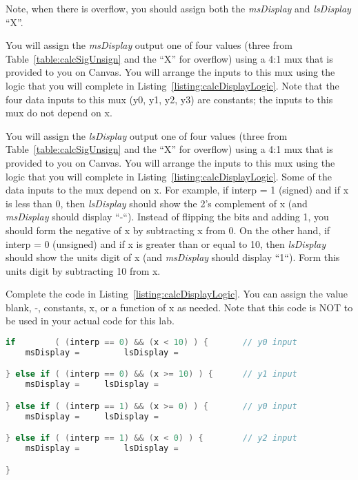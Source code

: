 Note, when there is overflow, you should assign both the
\emph{msDisplay} and \emph{lsDisplay} ``X''.

You will assign the \emph{msDisplay} output one of four values (three
from Table~\ref{table:calcSigUnsign} and the ``X'' for overflow) using a 4:1 mux that is
provided to you on Canvas. You will arrange the inputs to this mux using
the logic that you will complete in Listing~\ref{listing:calcDisplayLogic}. Note that the four data
inputs to this mux (y0, y1, y2, y3) are constants; the inputs to this
mux do not depend on x.

You will assign the \emph{lsDisplay} output one of four values (three
from Table~\ref{table:calcSigUnsign} and the ``X'' for overflow) using a 4:1 mux that is
provided to you on Canvas. You will arrange the inputs to this mux using
the logic that you will complete in Listing~\ref{listing:calcDisplayLogic}. Some of the data inputs
to the mux depend on x. For example, if interp = 1 (signed) and if x is
less than 0, then \emph{lsDisplay} should show the 2's complement of x
(and \emph{msDisplay} should display ``-``). Instead of flipping the
bits and adding 1, you should form the negative of x by subtracting x
from 0. On the other hand, if interp = 0 (unsigned) and if x is greater
than or equal to 10, then \emph{lsDisplay} should show the units digit
of x (and \emph{msDisplay} should display ``1``). Form this units digit
by subtracting 10 from x.

Complete the code in Listing~\ref{listing:calcDisplayLogic}. You can assign the value blank, -,
constants, x, or a function of x as needed. Note that this code is NOT
to be used in your actual code for this lab.


\begin{lstlisting}[language=Verilog,
 caption={Logic that determines the output of the 4:1 muxes in Figure~\ref{fig:calcSevenSeg}.},
 label={listing:calcDisplayLogic},
 frame=single]
if        ( (interp == 0) && (x < 10) ) {		// y0 input
    msDisplay = 		lsDisplay = 	

} else if ( (interp == 0) && (x >= 10) ) {		// y1 input
    msDisplay =		lsDisplay =

} else if ( (interp == 1) && (x >= 0) ) {		// y0 input
    msDisplay =		lsDisplay = 

} else if ( (interp == 1) && (x < 0) ) {		// y2 input
    msDisplay = 		lsDisplay = 

}
\end{lstlisting}




